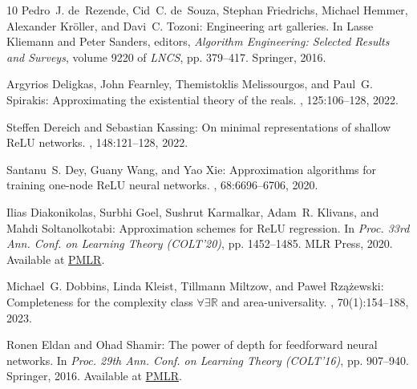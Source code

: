 \begin{thebibliography}{10}
{\sc Pedro~J. de~Rezende, Cid~C. de~Souza, Stephan Friedrichs, Michael Hemmer,
  Alexander Kr{\"{o}}ller, and Davi~C. Tozoni}: Engineering art galleries.
\newblock In {\sc Lasse Kliemann and Peter Sanders}, editors, {\em Algorithm
  Engineering: Selected Results and Surveys}, volume 9220 of {\em LNCS}, pp.
  379--417. Springer, 2016.

{\sc Argyrios Deligkas, John Fearnley, Themistoklis Melissourgos, and Paul~G.
  Spirakis}: Approximating the existential theory of the reals.
, 125:106--128, 2022.

{\sc Steffen Dereich and Sebastian Kassing}: On minimal representations of
  shallow {ReLU} networks.
, 148:121--128, 2022.

{\sc Santanu~S. Dey, Guany Wang, and Yao Xie}: Approximation algorithms for
  training one-node {ReLU} neural networks.
, 68:6696--6706, 2020.

{\sc Ilias Diakonikolas, Surbhi Goel, Sushrut Karmalkar, Adam~R. Klivans, and
  Mahdi Soltanolkotabi}: Approximation schemes for {ReLU} regression.
\newblock In {\em Proc. 33rd Ann. Conf. on Learning Theory (COLT'20)}, pp.
  1452--1485. MLR Press, 2020.
\newblock Available at
  \href{https://proceedings.mlr.press/v125/diakonikolas20b.html}{PMLR}.

{\sc Michael~G. Dobbins, Linda Kleist, Tillmann Miltzow, and Pawe{\l{}}
  Rz{\k{a}}{\.{z}}ewski}: Completeness for the complexity class
  $\forall\exists\mathbb{R}$ and area-universality.
, 70(1):154--188, 2023.
\newblock [\epfmtdoi{10.1007/s00454-022-00381-0}]

{\sc Ronen Eldan and Ohad Shamir}: The power of depth for feedforward neural
  networks.
\newblock In {\em Proc. 29th Ann. Conf. on Learning Theory (COLT'16)}, pp.
  907--940. Springer, 2016.
\newblock Available at
  \href{https://proceedings.mlr.press/v49/eldan16.html}{PMLR}.


\end{thebibliography}
